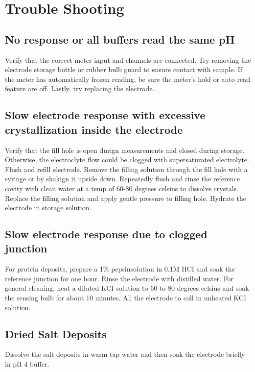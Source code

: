 \documentclass[12pt]{../SOP3_beta}\usepackage[]{graphicx}\usepackage[]{color}
\begin{document}
\section{Trouble Shooting}

\subsection{No response or all buffers read the same pH}

\NP Verify that the correct meter input and channels are connected. Try removing the electrode storage bottle or rubber bulb guard to ensure contact with sample. If the meter has automatically frozen reading, be sure the meter's hold or auto read feature are off. Lastly, try replacing the electrode.  

\subsection{Slow electrode response with excessive crystallization inside the electrode}

\NP Verify that the fill hole is open durign measurements and closed during storage. Otherwise, the electroclyte flow could be clogged with supersaturated electrolyte. Flush and refill electrode. Remove the filling solution through the fill hole with a syringe or by shakign it upside down. Repeatedly flush and rinse the reference cavity with clean water at a temp of 60-80 degrees celsius to dissolve crystals. Replace the filling solution and apply gentle pressure to filling hole. Hydrate the electrode in storage solution.

\subsection{Slow electrode response due to clogged junction}

\NP For protein deposits, prepare a 1\% pepsinsolution in 0.1M HCI and soak the reference junction for one hour. Rinse the electrode with distilled water. For general cleaning, heat a diluted KCI solution to 60 to 80 degrees celsius and soak the sensing bulb for about 10 minutes. All the electrode to coll in unheated KCI solution.

\subsection{Dried Salt Deposits}

\NP Dissolve the salt deposits in warm tap water and then soak the electrode briefly in pH 4 buffer.
\end{document}
